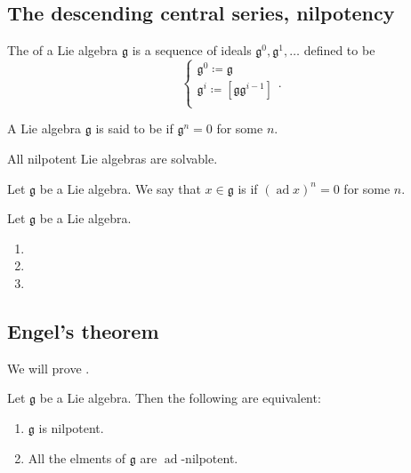 \documentclass{article}
\newcommand{\lb}[1]{\ensuremath{\left[{#1}\right]}}
\DeclareMathOperator{\ad}{ad}
\newcommand{\frkg}{{\ensuremath{\mathfrak{g}}}}
\begin{document}
\subsection{The descending central series, nilpotency}

\begin{definition}
    The  of a Lie algebra $\frkg$ is a sequence of ideals $\frkg^0, \frkg^1, \ldots$ defined to be
    \[
        \begin{cases}
            \frkg^0 \coloneq \frkg \\
            \frkg^i \coloneq \lb{\frkg\frkg^{i-1}} \\
        \end{cases}.
    \]
\end{definition}

\begin{definition}
    A Lie algebra $\frkg$ is said to be  if $\frkg^n = 0$ for some $n$.
\end{definition}

\begin{proposition}
    All nilpotent Lie algebras are solvable.
\end{proposition}

\begin{definition}
    Let $\frkg$ be a Lie algebra.
    We say that $x \in \frkg$ is  if $(\ad x)^n = 0$ for some $n$.
\end{definition}

\begin{theorem}
    Let $\frkg$ be a Lie algebra.
    \begin{enumerate}[label=(\alph*)]
        \item 
        \item 
        \item 
    \end{enumerate}
\end{theorem}

\subsection{Engel's theorem}

We will prove .

\begin{theorem}[Engel]
    Let $\frkg$ be a Lie algebra.
    Then the following are equivalent:
    \begin{enumerate}[label=(\roman*)]
        \item 
            $\frkg$ is nilpotent.
        \item 
            All the elments of $\frkg$ are $\ad$-nilpotent.
    \end{enumerate}
\end{theorem}
\end{document}
